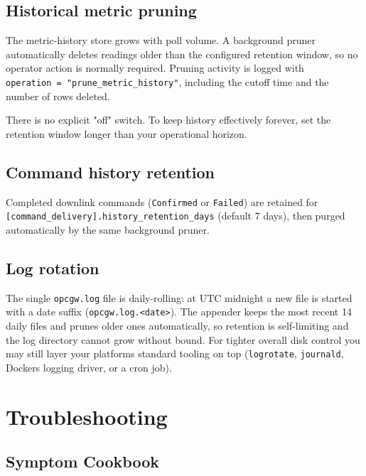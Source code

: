 \section{Historical metric pruning}\label{sec-historical-data-pruning}

The metric-history store grows with poll volume. A background pruner automatically deletes readings older than the configured retention window, so no operator action is normally required. Pruning activity is logged with \texttt{operation\ =\ "prune\_metric\_history"}, including the cutoff time and the number of rows deleted.

There is no explicit "off" switch. To keep history effectively forever, set the retention window longer than your operational horizon.

\section{Command history retention}\label{sec-command-history-pruning}

Completed downlink commands (\texttt{Confirmed} or \texttt{Failed}) are retained for \texttt{{[}command\_delivery{]}.history\_retention\_days} (default 7 days), then purged automatically by the same background pruner.

\section{Log rotation}\label{sec-log-rotation}

The single \texttt{opcgw.log} file is daily-rolling: at UTC midnight a new file is started with a date suffix (\texttt{opcgw.log.\textless{}date\textgreater{}}). The appender keeps the most recent 14 daily files and prunes older ones automatically, so retention is self-limiting and the log directory cannot grow without bound. For tighter overall disk control you may still layer your platform\textquotesingle s standard tooling on top (\texttt{logrotate}, \texttt{journald}, Docker\textquotesingle s logging driver, or a cron job).

\chapter{Troubleshooting}\label{ch-troubleshooting}

\section{Symptom Cookbook}\label{sec-symptom-cookbook}

